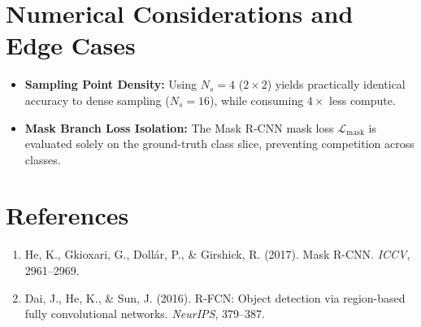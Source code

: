 \documentclass[11pt,a4paper]{article}
\theoremstyle{definition}
\begin{document}
\section{Numerical Considerations and Edge Cases}

\begin{itemize}
    \item \textbf{Sampling Point Density:} Using $N_s = 4$ ($2 \times 2$) yields practically identical accuracy to dense sampling ($N_s = 16$), while consuming $4\times$ less compute.
    \item \textbf{Mask Branch Loss Isolation:} The Mask R-CNN mask loss $\mathcal{L}_{\text{mask}}$ is evaluated solely on the ground-truth class slice, preventing competition across classes.
\end{itemize}

\section{References}
\begin{enumerate}
    \item He, K., Gkioxari, G., Doll{\'a}r, P., & Girshick, R. (2017). Mask R-CNN. \emph{ICCV}, 2961--2969.
    \item Dai, J., He, K., & Sun, J. (2016). R-FCN: Object detection via region-based fully convolutional networks. \emph{NeurIPS}, 379--387.
\end{enumerate}
\end{document}

